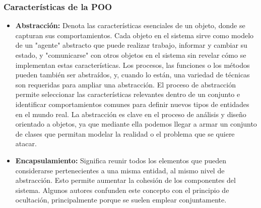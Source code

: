 \documentclass[12pt,a4paper,spanish]{book} %
\begin{document}
\subsubsection{Características de la POO}

\begin{itemize}
\item\textbf{Abstracción:} Denota las características esenciales de un objeto, donde se capturan sus comportamientos. Cada objeto en el sistema sirve como modelo de un "agente" abstracto que puede realizar trabajo, informar y cambiar su estado, y "comunicarse" con otros objetos en el sistema sin revelar cómo se implementan estas características. Los procesos, las funciones o los métodos pueden también ser abstraídos, y, cuando lo están, una variedad de técnicas son requeridas para ampliar una abstracción. El proceso de abstracción permite seleccionar las características relevantes dentro de un conjunto e identificar comportamientos comunes para definir nuevos tipos de entidades en el mundo real. La abstracción es clave en el proceso de análisis y diseño orientado a objetos, ya que mediante ella podemos llegar a armar un conjunto de clases que permitan modelar la realidad o el problema que se quiere atacar.
\item\textbf{Encapsulamiento:} Significa reunir todos los elementos que pueden considerarse pertenecientes a una misma entidad, al mismo nivel de abstracción. Esto permite aumentar la cohesión de los componentes del sistema. Algunos autores confunden este concepto con el principio de ocultación, principalmente porque se suelen emplear conjuntamente.


\end{itemize}
\end{document}
